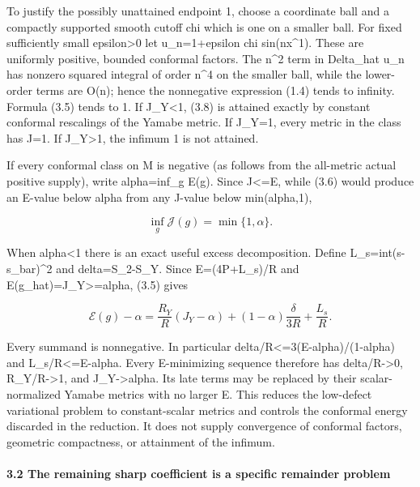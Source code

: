 \documentclass[
  10pt,
]{article}
\begin{document}
To justify the possibly unattained endpoint 1, choose a coordinate ball
and a compactly supported smooth cutoff chi which is one on a smaller
ball. For fixed sufficiently small epsilon\textgreater0 let
u\_n=1+epsilon chi sin(nx\^{}1). These are uniformly positive, bounded
conformal factors. The n\^{}2 term in Delta\_hat u\_n has nonzero
squared integral of order n\^{}4 on the smaller ball, while the
lower-order terms are O(n); hence the nonnegative expression (1.4) tends
to infinity. Formula (3.5) tends to 1. If J\_Y\textless1, (3.8) is
attained exactly by constant conformal rescalings of the Yamabe metric.
If J\_Y=1, every metric in the class has J=1. If J\_Y\textgreater1, the
infimum 1 is not attained.

If every conformal class on M is negative (as follows from the
all-metric actual positive supply), write alpha=inf\_g E(g). Since
J\textless=E, while (3.6) would produce an E-value below alpha from any
J-value below min(alpha,1),

\[
                 \boxed{\inf_g\mathcal J(g)=\min\{1,\alpha\}.}
                                                               \tag{3.9}
\]

When alpha\textless1 there is an exact useful excess decomposition.
Define L\_s=int(s-s\_bar)\^{}2 and delta=S\_2-S\_Y. Since E=(4P+L\_s)/R
and E(g\_hat)=J\_Y\textgreater=alpha, (3.5) gives

\[
 \boxed{\mathcal E(g)-\alpha=
   \frac{R_Y}{R}(J_Y-\alpha)
   +(1-\alpha)\frac{\delta}{3R}+\frac{L_s}{R}.}          \tag{3.10}
\]

Every summand is nonnegative. In particular
delta/R\textless=3(E-alpha)/(1-alpha) and L\_s/R\textless=E-alpha. Every
E-minimizing sequence therefore has delta/R-\textgreater0,
R\_Y/R-\textgreater1, and J\_Y-\textgreater alpha. Its late terms may be
replaced by their scalar-normalized Yamabe metrics with no larger E.
This reduces the low-defect variational problem to constant-scalar
metrics and controls the conformal energy discarded in the reduction. It
does not supply convergence of conformal factors, geometric compactness,
or attainment of the infimum.

\hypertarget{the-remaining-sharp-coefficient-is-a-specific-remainder-problem}{%
\paragraph{3.2 The remaining sharp coefficient is a specific remainder
problem}\label{the-remaining-sharp-coefficient-is-a-specific-remainder-problem}}
\end{document}
